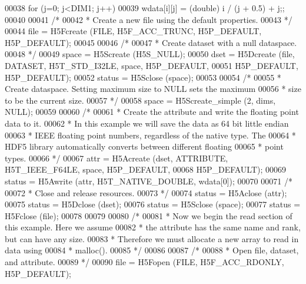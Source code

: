 \begin{DoxyCode}
00038         \textcolor{keywordflow}{for} (j=0; j<DIM1; j++)
00039             wdata[i][j] = (\textcolor{keywordtype}{double}) i / (j + 0.5) + j;;
00040 
00041     \textcolor{comment}{/*}
00042 \textcolor{comment}{     * Create a new file using the default properties.}
00043 \textcolor{comment}{     */}
00044     file = H5Fcreate (FILE, H5F\_ACC\_TRUNC, H5P\_DEFAULT, H5P\_DEFAULT);
00045 
00046     \textcolor{comment}{/*}
00047 \textcolor{comment}{     * Create dataset with a null dataspace.}
00048 \textcolor{comment}{     */}
00049     space = H5Screate (H5S\_NULL);
00050     dset = H5Dcreate (file, DATASET, H5T\_STD\_I32LE, space, H5P\_DEFAULT,
00051                 H5P\_DEFAULT, H5P\_DEFAULT);
00052     status = H5Sclose (space);
00053 
00054     \textcolor{comment}{/*}
00055 \textcolor{comment}{     * Create dataspace.  Setting maximum size to NULL sets the maximum}
00056 \textcolor{comment}{     * size to be the current size.}
00057 \textcolor{comment}{     */}
00058     space = H5Screate\_simple (2, dims, NULL);
00059 
00060     \textcolor{comment}{/*}
00061 \textcolor{comment}{     * Create the attribute and write the floating point data to it.}
00062 \textcolor{comment}{     * In this example we will save the data as 64 bit little endian}
00063 \textcolor{comment}{     * IEEE floating point numbers, regardless of the native type.  The}
00064 \textcolor{comment}{     * HDF5 library automatically converts between different floating}
00065 \textcolor{comment}{     * point types.}
00066 \textcolor{comment}{     */}
00067     attr = H5Acreate (dset, ATTRIBUTE, H5T\_IEEE\_F64LE, space, H5P\_DEFAULT,
00068                 H5P\_DEFAULT);
00069     status = H5Awrite (attr, H5T\_NATIVE\_DOUBLE, wdata[0]);
00070 
00071     \textcolor{comment}{/*}
00072 \textcolor{comment}{     * Close and release resources.}
00073 \textcolor{comment}{     */}
00074     status = H5Aclose (attr);
00075     status = H5Dclose (dset);
00076     status = H5Sclose (space);
00077     status = H5Fclose (file);
00078 
00079 
00080     \textcolor{comment}{/*}
00081 \textcolor{comment}{     * Now we begin the read section of this example.  Here we assume}
00082 \textcolor{comment}{     * the attribute has the same name and rank, but can have any size.}
00083 \textcolor{comment}{     * Therefore we must allocate a new array to read in data using}
00084 \textcolor{comment}{     * malloc().}
00085 \textcolor{comment}{     */}
00086 
00087     \textcolor{comment}{/*}
00088 \textcolor{comment}{     * Open file, dataset, and attribute.}
00089 \textcolor{comment}{     */}
00090     file = H5Fopen (FILE, H5F\_ACC\_RDONLY, H5P\_DEFAULT);

\end{DoxyCode}
